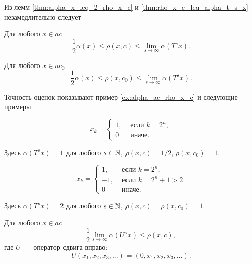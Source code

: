 Из лемм \ref{thm:alpha_x_leq_2_rho_x_c} и \ref{thm:rho_x_c_leq_alpha_t_s_x}
незамедлительно следует
\begin{theorem}
	\label{thm:rho_x_c_leq_alpha_t_s_x_united}
	Для любого $x\in ac$
	\begin{equation}
		\frac{1}{2} \alpha(x) \leq \rho(x,c)\leq \lim_{s\to\infty} \alpha(T^s x)
		.
	\end{equation}
\end{theorem}

\begin{corollary}
	\label{cor:rho_x_c0_leq_alpha_t_s_x_united}
	Для любого $x\in ac_0$
	\begin{equation}
		\frac{1}{2} \alpha(x) \leq \rho(x,c_0)\leq \lim_{s\to\infty} \alpha(T^s x)
		.
	\end{equation}
\end{corollary}

Точность оценок показывают пример \ref{ex:alpha_ac_rho_x_c} и следующие примеры.
\begin{example}
	\begin{equation}
		x_k = \begin{cases}
			1, &\mbox{~если~} k = 2^n,
			\\
			0 &\mbox{~иначе.}
		\end{cases}
	\end{equation}
\end{example}
Здесь $\alpha(T^s x) = 1$ для любого $s\in\mathbb{N}$, $\rho(x,c) = 1/2$, $\rho(x, c_0) = 1$.

\begin{example}
	\begin{equation}
		x_k = \begin{cases}
			1, &\mbox{~если~} k = 2^n,
			\\
			-1, &\mbox{~если~} k = 2^n + 1 > 2
			\\
			0 &\mbox{~иначе.}
		\end{cases}
	\end{equation}
\end{example}
Здесь $\alpha(T^s x) = 2$ для любого $s\in\mathbb{N}$, $\rho(x,c) = \rho(x, c_0) = 1$.


\begin{hypothesis}
	Для любого $x\in ac$
	\begin{equation}
		\frac{1}{2} \lim_{s\to\infty} \alpha(U^s x) \leq \rho(x,c)
		,
	\end{equation}
	где $U$~--- оператор сдвига вправо:
	\begin{equation}
		U(x_1, x_2, x_3, ...) = (0, x_1, x_2, x_3, ...)
		.
	\end{equation}
\end{hypothesis}
